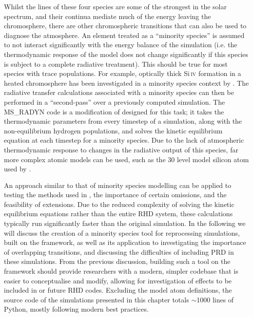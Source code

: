 Whilst the lines of these four species are some of the strongest in the solar spectrum, and their continua mediate much of the energy leaving the chromosphere, there are other chromospheric transitions that can also be used to diagnose the atmosphere.
An element treated as a ``minority species'' is assumed to not interact significantly with the energy balance of the simulation (i.e. the thermodynamic response of the model does not change significantly if this species is subject to a complete radiative treatment).
This should be true for most species with trace populations.
For example, optically thick Si\,\textsc{iv} formation in a heated chromosphere has been investigated in a minority species context by \citet{Kerr2019c}.
The radiative transfer calculations associated with a minority species can then be performed in a ``second-pass'' over a previously computed \Radyn{} simulation.
The MS\_RADYN code is a modification of \Radyn{} designed for this task; it takes the thermodynamic parameters from every timestep of a \Radyn{} simulation, along with the non-equilibrium hydrogen populations, and solves the kinetic equilibrium equation at each timestep for a minority species.
Due to the lack of atmospheric thermodynamic response to changes in the radiative output of this species, far more complex atomic models can be used, such as the 30 level model silicon atom used by \citet{Kerr2019c}.

An approach similar to that of minority species modelling can be applied to testing the methods used in \Radyn{}, the importance of certain omissions, and the feasibility of extensions.
Due to the reduced complexity of solving the kinetic equilibrium equations rather than the entire RHD system, these calculations typically run significantly faster than the original simulation.
In the following we will discuss the creation of a minority species tool for reprocessing \Radyn{} simulations, built on the \Lw{} framework, as well as its application to investigating the importance of overlapping transitions, and discussing the difficulties of including PRD in these simulations.
From the previous discussion, building such a tool on the \Lw{} framework should provide researchers with a modern, simpler codebase that is easier to conceptualise and modify, allowing for investigation of effects to be included in \Radyn{} or future RHD codes.
Excluding the model atom definitions, the source code of the simulations presented in this chapter totals $\sim$1000 lines of Python, mostly following modern best practices.


